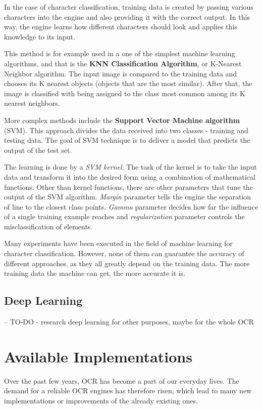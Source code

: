 In the case of character classification, training data is created by passing various characters into the engine and also providing it with the correct output. In this way, the engine learns how different characters should look and applies this knowledge to its input.

This method is for example used in a one of the simplest machine learning algorithms, and that is the \textbf{KNN Classification Algorithm}, or K-Nearest Neighbor algorithm. The input image is compared to the training data and chooses its K nearest objects (objects that are the most similar). After that, the image is classified with being assigned to the class most common among its K nearest neighbors.

More complex methods include the \textbf{Support Vector Machine algorithm} (SVM). This approach divides the data received into two classes - training and testing data. The goal of SVM technique is to deliver a model that predicts the output of the test set.

The learning is done by a \emph{SVM kernel}. The task of the kernel is to take the input data and transform it into the desired form using a combination of mathematical functions. Other than kernel functions, there are other parameters that tune the output of the SVM algorithm. \emph{Margin} parameter tells the engine the separation of line to the closest class points. \emph{Gamma} parameter decides how far the influence of a single training example reaches and \emph{regularization} parameter controls the misclassification of elements.

Many experiments have been executed in the field of machine learning for character classification. However, none of them can guarantee the accuracy of different approaches, as they all greatly depend on the training data. The more training data the machine can get, the more accurate it is. 

\subsection{Deep Learning}
-- TO-DO - research deep learning for other purposes, maybe for the whole OCR

\section{Available Implementations}

Over the past few years, OCR has become a part of our everyday lives. The demand for a reliable OCR engines has therefore risen, which lead to many new implementations or improvements of the already existing ones.

